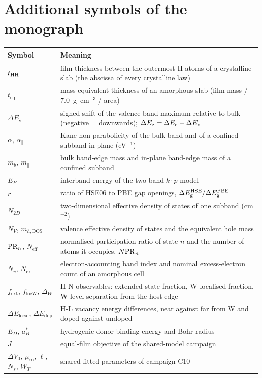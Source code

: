 \section*{Additional symbols of the monograph}
\begin{longtable}{@{}p{2.6cm}p{11.5cm}@{}}
\toprule
Symbol & Meaning \\\midrule\endhead
$t_{\mathrm{HH}}$ & film thickness between the outermost H atoms of a crystalline slab (the abscissa of every crystalline law) \\
$t_{\mathrm{eq}}$ & mass-equivalent thickness of an amorphous slab (film mass / 7.0~g~cm$^{-3}$ / area) \\
$\Delta E_{\mathrm{v}}$ & signed shift of the valence-band maximum relative to bulk (negative = downwards); $\Delta E_{\mathrm{g}} = \Delta E_{\mathrm{c}} - \Delta E_{\mathrm{v}}$ \\
$\alpha$, $\alpha_\parallel$ & Kane non-parabolicity of the bulk band and of a confined subband in-plane (eV$^{-1}$) \\
$m_b$, $m_\parallel$ & bulk band-edge mass and in-plane band-edge mass of a confined subband \\
$E_P$ & interband energy of the two-band $k\cdot p$ model \\
$r$ & ratio of HSE06 to PBE gap openings, $\Delta E_{\mathrm{g}}^{\mathrm{HSE}}/\Delta E_{\mathrm{g}}^{\mathrm{PBE}}$ \\
$N_{2D}$ & two-dimensional effective density of states of one subband (cm$^{-2}$) \\
$N_V$, $m_{h,\mathrm{DOS}}$ & valence effective density of states and the equivalent hole mass \\
$\mathrm{PR}_{n}$, $N_{\mathrm{eff}}$ & normalised participation ratio of state $n$ and the number of atoms it occupies, $N\mathrm{PR}_{n}$ \\
$N_v$, $N_{\mathrm{ex}}$ & electron-accounting band index and nominal excess-electron count of an amorphous cell \\
$f_{\mathrm{ext}}$, $f_{\mathrm{locW}}$, $\Delta_W$ & H-N observables: extended-state fraction, W-localised fraction, W-level separation from the host edge \\
$\Delta E_{\mathrm{local}}$, $\Delta E_{\mathrm{dop}}$ & H-L vacancy energy differences, near against far from W and doped against undoped \\
$E_D$, $a_B^*$ & hydrogenic donor binding energy and Bohr radius \\
$J$ & equal-film objective of the shared-model campaign \\
$\Delta V_0$, $\mu_\infty$, $\ell$, $N_s$, $W_T$ & shared fitted parameters of campaign C10 \\\bottomrule
\end{longtable}
